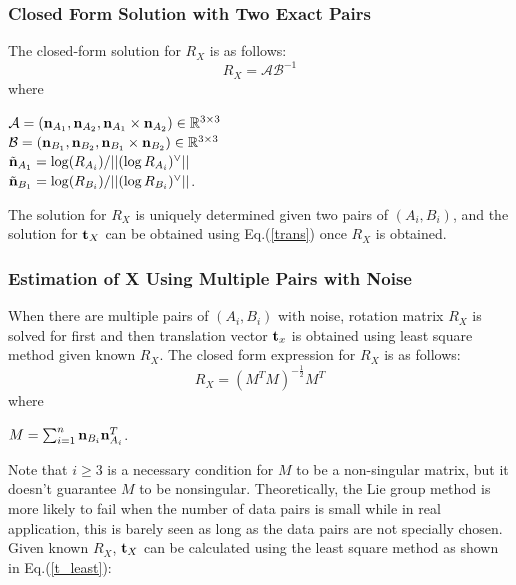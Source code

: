 \documentclass[twocolumn,10pt]{asme2ej}
\newcommand{\nn}{{\bf n}}
\newcommand{\ttt}{{\bf t}}
\begin{document}
\subsubsection{Closed Form Solution with Two Exact Pairs}
The closed-form solution for $R_{X}$ is as follows:
\begin{equation}
R_{X} = \mathcal{A}\mathcal{B}^{-1}
\label{Lie_Rotation}
\end{equation}
where\\

\begin{center}
$\mathcal{A} = (\nn_{A_{1}}, \nn_{A_{2}}, \nn_{A_{1}} \times \nn_{A_{2}}) \in \mathbb{R}^{3 \times 3}$\\
 $\mathcal{B} = (\nn_{B_{1}}, \nn_{B_{2}}, \nn_{B_{1}} \times \nn_{B_{2}}) \in \mathbb{R}^{3 \times 3} $\\
$\tilde{\nn}_{A_{1}} = \log(R_{A_{i}})/||(\log R_{A_{i}})^{\vee}||$\\
$\tilde{\nn}_{B_{1}} = \log(R_{B_{i}})/||(\log R_{B_{i}})^{\vee}||$.
\end{center}
The solution for $R_X$ is uniquely determined given two pairs of $(A_i, B_i)$, and the solution for $\ttt_{X}$ can be obtained using Eq.(\ref{trans}) once $R_{X}$ is obtained.\\

\subsubsection{Estimation of X Using Multiple Pairs with Noise}
When there are multiple pairs of $(A_{i}, B_{i})$ with noise, rotation matrix $R_{X}$ is solved for first and then translation vector $\ttt_{x}$ is obtained using least square method given known $R_{X}$. The closed form expression for $R_{X}$ is as follows:
\begin{equation}
R_{X} = (M^{T}M)^{-\frac{1}{2}}M^{T}
\end{equation}
where \\
\begin{center}
$M = \sum_{i=1}^{n}{\nn_{B_{i}} \nn_{A_{i}}^{T}}$.
\end{center}
Note that $i \geq 3$ is a necessary condition for $M$ to be a non-singular matrix, but it doesn't guarantee $M$ to be nonsingular. Theoretically, the Lie group method is more likely to fail when the number of data pairs is small while in real application, this is barely seen as long as the data pairs are not specially chosen. Given known $R_{X}$, $\ttt_{X}$ can be calculated using the least square method as shown in Eq.(\ref{t_least}):
\end{document}
